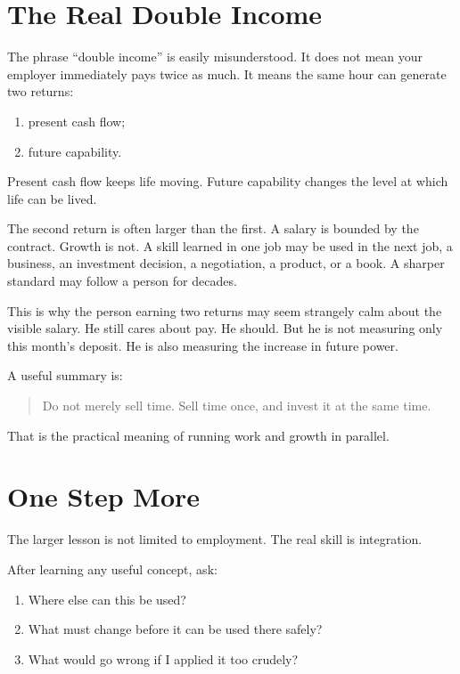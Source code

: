 \section*{The Real Double Income}

The phrase ``double income'' is easily misunderstood. It does not mean your employer immediately pays twice as much. It means the same hour can generate two returns:

\begin{enumerate}
\item present cash flow;
\item future capability.
\end{enumerate}

Present cash flow keeps life moving. Future capability changes the level at which life can be lived.

The second return is often larger than the first. A salary is bounded by the contract. Growth is not. A skill learned in one job may be used in the next job, a business, an investment decision, a negotiation, a product, or a book. A sharper standard may follow a person for decades.

This is why the person earning two returns may seem strangely calm about the visible salary. He still cares about pay. He should. But he is not measuring only this month's deposit. He is also measuring the increase in future power.

A useful summary is:

\begin{quote}
Do not merely sell time. Sell time once, and invest it at the same time.
\end{quote}

That is the practical meaning of running work and growth in parallel.

\section*{One Step More}

The larger lesson is not limited to employment. The real skill is integration.

After learning any useful concept, ask:

\begin{enumerate}
\item Where else can this be used?
\item What must change before it can be used there safely?
\item What would go wrong if I applied it too crudely?
\end{enumerate}


